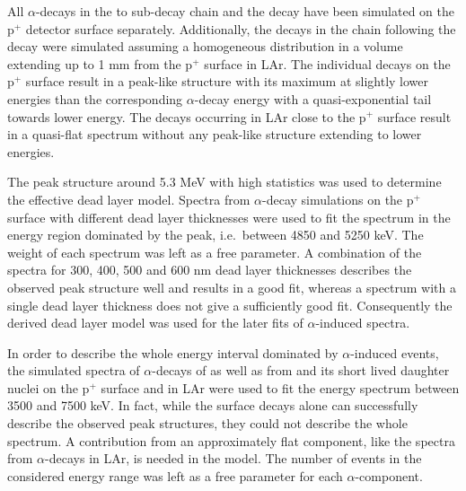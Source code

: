 All $\alpha$-decays in the  to  sub-decay chain and the  decay have been simulated on the p$^+$ detector surface separately. Additionally, the decays in the chain following the  decay were simulated assuming a homogeneous distribution in a volume extending up to 1 mm from the p$^+$ surface in LAr. The individual decays on the p$^+$ surface result in a peak-like structure with its maximum at slightly lower energies than the corresponding $\alpha$-decay energy with a quasi-exponential tail towards lower energy. The decays occurring in LAr close to the p$^+$ surface result in a quasi-flat spectrum without any peak-like structure extending to lower energies.

The  peak structure around 5.3 MeV with high statistics was used to determine the effective dead layer model. Spectra from  $\alpha$-decay simulations on the p$^+$ surface with different dead layer thicknesses were used to fit the spectrum in the energy region dominated by the  peak, i.e.~between 4850 and 5250 keV. The weight of each spectrum was left as a free parameter. A combination of the spectra for 300, 400, 500 and 600 nm dead layer thicknesses describes the observed peak structure well and results in a good fit, whereas a spectrum with a single dead layer thickness does not give a sufficiently good fit. Consequently the derived dead layer model was used for the later fits of $\alpha$-induced spectra.

In order to describe the whole energy interval dominated by $\alpha$-induced events, the simulated spectra of $\alpha$-decays of  as well as from  and its short lived daughter nuclei on the p$^+$ surface and in LAr were used to fit the energy spectrum between 3500 and 7500 keV. In fact, while the surface decays alone can successfully describe the observed peak structures, they could not describe the whole spectrum. A contribution from an approximately flat component, like the spectra from $\alpha$-decays in LAr, is needed in the model. The number of events in the considered energy range was left as a free parameter for each $\alpha$-component.


